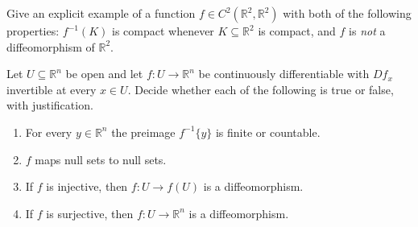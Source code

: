 \begin{exercise}
\label{ex:box_proper_map_not_diffeomorphism}
Give an explicit example of a function $f \in C^2(\mathbb{R}^2,\mathbb{R}^2)$ with both of the
following properties: $f^{-1}(K)$ is compact whenever $K \subseteq \mathbb{R}^2$ is compact, and
$f$ is \emph{not} a diffeomorphism of $\mathbb{R}^2$.
\end{exercise}

\begin{exercise}
\label{ex:local_diffeomorphism_four_consequences}
Let $U \subseteq \mathbb{R}^n$ be open and let $f : U \to \mathbb{R}^n$ be continuously
differentiable with $Df_x$ invertible at every $x \in U$. Decide whether each of the following is
true or false, with justification.
\begin{enumerate}[label=\textbf{(\alph*)}]
  \item For every $y \in \mathbb{R}^n$ the preimage $f^{-1}\{y\}$ is finite or countable.
  \item $f$ maps null sets to null sets.
  \item If $f$ is injective, then $f : U \to f(U)$ is a diffeomorphism.
  \item If $f$ is surjective, then $f : U \to \mathbb{R}^n$ is a diffeomorphism.
\end{enumerate}
\end{exercise}

